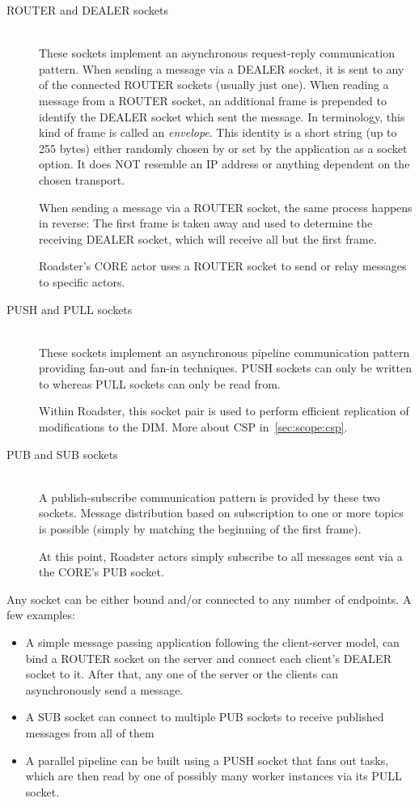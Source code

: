\begin{description}
	\item [ROUTER and DEALER sockets] \hfil\\
	These sockets implement an asynchronous request-reply communication
	pattern. When sending a message via a DEALER socket, it is sent
	to any of the connected ROUTER sockets (usually just one). When
	reading a message from a ROUTER socket, an additional frame is
	prepended to identify the DEALER socket which sent the message.
	In \zmq terminology, this kind of frame is called an
	\emph{envelope}.
	This identity is a short string (up to 255 bytes) either randomly chosen by \zmq
	or set by the application as a socket option. It does NOT
	resemble an IP address or anything dependent on the chosen
	transport.

	When sending a message via a ROUTER socket, the same
	process happens in reverse: The first frame is taken away and
	used to determine the receiving DEALER socket, which will
	receive all but the first frame.

	Roadster's CORE actor uses a ROUTER socket to send or relay
	messages to specific actors.


	\item [PUSH and PULL sockets] \hfil\\
	These sockets implement an asynchronous pipeline communication pattern
	providing fan-out and fan-in techniques. PUSH sockets can only be
	written to whereas PULL sockets can only be read from.


	Within Roadster, this socket pair is used to perform efficient
	replication of modifications to the DIM. More about CSP
	in~\autoref{sec:scope:csp}.


	\item [PUB and SUB sockets] \hfil\\
	A publish-subscribe communication pattern is provided by these two
	sockets. Message distribution based on subscription to one or
	more topics is possible (simply by matching the beginning of the first
	frame).

	At this point, Roadster actors simply
	subscribe to all messages sent via a the CORE's PUB socket.

\end{description}

Any socket can be either bound and/or connected to any number of endpoints. A few examples:

\begin{itemize}
	\item A simple message passing application following the client-server
		model, can bind a ROUTER socket on the server and connect each
		client's DEALER socket to it. After that, any one of the server
		or the clients can asynchronously send a message.

	\item A SUB socket can connect to multiple PUB sockets to receive
		published messages from all of them

	\item A parallel pipeline can be built using a PUSH socket that fans
		out tasks, which are then read by one of possibly many worker
		instances via its PULL socket.
\end{itemize}

